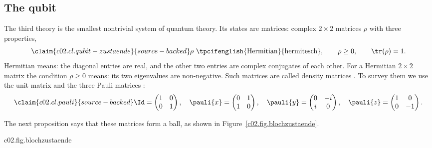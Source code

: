 \subsection{The qubit}\label{c02.s4.3}

The third theory is the smallest nontrivial system of quantum theory. Its states are matrices:
complex $2\times 2$ matrices $\rho$ with three properties,
\begin{equation}\label{c02.eq.qubit}\claim{c02.cl.qubit-zustaende}{source-backed}
  \rho\ \text{\tpcifenglish{Hermitian}{hermitesch}}, \qquad \rho \geq 0, \qquad \tr(\rho) = 1 .
\end{equation}
Hermitian means: the diagonal entries are real, and the other two entries are complex
conjugates of each other. For a Hermitian $2\times 2$ matrix the condition $\rho \geq 0$
means: its two eigenvalues are non-negative. Such matrices are called density matrices
.
To survey them we use the unit matrix and the three Pauli matrices
:
\begin{equation}\label{c02.eq.pauli}\claim{c02.cl.pauli}{source-backed}
  \Id = \begin{pmatrix} 1 & 0 \\ 0 & 1 \end{pmatrix}, \quad
  \pauli{x} = \begin{pmatrix} 0 & 1 \\ 1 & 0 \end{pmatrix}, \quad
  \pauli{y} = \begin{pmatrix} 0 & -i \\ i & 0 \end{pmatrix}, \quad
  \pauli{z} = \begin{pmatrix} 1 & 0 \\ 0 & -1 \end{pmatrix} .
\end{equation}

The next proposition says that these matrices form a ball, as shown in Figure~\ref{c02.fig.blochzustaende}.

\begin{tpcfigure}{c02.fig.blochzustaende}
  \caption{The states of the qubit as points of the unit ball. The points $\vb{n}$, $-\vb{n}$, $\vb{m}$, $-\vb{m}$ of the surface are pure states. The state $\vb{r} = \tfrac12\vb{n}$ in the interior is the mixture $\tfrac34\vb{n} + \tfrac14(-\vb{n})$. The centre is midway between $\vb{n}$ and $-\vb{n}$ and also midway between $\vb{m}$ and $-\vb{m}$.}
\end{tpcfigure}

